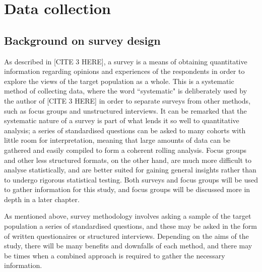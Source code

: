 
\chapter{Data collection}

\section{Background on survey design}




As described in [CITE 3 HERE], a survey is a means of obtaining quantitative information regarding opinions and 
experiences of the respondents in order to explore the views of the target population as a whole. This is a systematic
method of collecting data, where the word ``systematic" is deliberately used by the author of [CITE 3 HERE] in order to separate
surveys from other methods, such as focus groups and unstructured interviews. It can be remarked that the systematic nature of
a survey is part of what lends it so well to quantitative analysis; a series of standardised questions can be asked to many
cohorts with little room for interpretation, meaning that large amounts of data can be gathered and easily compiled to
form a coherent rolling analysis. Focus groups and other less structured formats, on the other hand, are much more difficult 
to analyse statistically, and are better suited for gaining general insights rather than to undergo rigorous statistical 
testing. Both surveys and focus groups will be used to gather information for this study, and focus groups will be discussed 
more in depth in a later chapter.

As mentioned above, survey methodology involves asking a sample of the target population a series of standardised questions, 
and these may be asked in the form of written questionaires or structured interviews. Depending on the aims of the study, there
will be many benefits and downfalls of each method, and there may be times when a combined approach is required to
gather the necessary information. 

